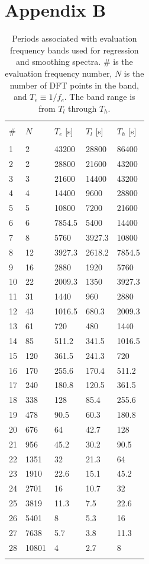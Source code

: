 \documentclass[draft,linenumbers]{agujournal2018}
\begin{document}
\section{Appendix B}

\begin{table}
  \caption{Periods associated with evaluation frequency bands used for regression and smoothing spectra. \# is the evaluation frequency number, $N$ is the number of DFT points in the band, and $T_e\equiv 1/f_e$. The band range is from $T_l$ through $T_h$.}
  \centering
  \begin{tabular}{l l l l l}
    \hline \\
    \# & $N$ & $T_e$ [s] & $T_l$ [s] & $T_h$ [s] \\
    \hline \\
    1 & 2 & 43200 & 28800 & 86400 \\
    2 & 2 & 28800 & 21600 & 43200 \\
    3 & 3 & 21600 & 14400 & 43200 \\
    4 & 4 & 14400 & 9600 & 28800 \\
    5 & 5 & 10800 & 7200 & 21600 \\
    6 & 6 & 7854.5 & 5400 & 14400 \\
    7 & 8 & 5760 & 3927.3 & 10800 \\
    8 & 12 & 3927.3 & 2618.2 & 7854.5 \\
    9 & 16 & 2880 & 1920 & 5760 \\
    10 & 22 & 2009.3 & 1350 & 3927.3 \\
    11 & 31 & 1440 & 960 & 2880 \\
    12 & 43 & 1016.5 & 680.3 & 2009.3 \\
    13 & 61 & 720 & 480 & 1440 \\
    14 & 85 & 511.2 & 341.5 & 1016.5 \\
    15 & 120 & 361.5 & 241.3 & 720 \\
    16 & 170 & 255.6 & 170.4 & 511.2 \\
    17 & 240 & 180.8 & 120.5 & 361.5 \\
    18 & 338 & 128 & 85.4 & 255.6 \\
    19 & 478 & 90.5 & 60.3 & 180.8 \\
    20 & 676 & 64 & 42.7 & 128 \\
    21 & 956 & 45.2 & 30.2 & 90.5 \\
    22 & 1351 & 32 & 21.3 & 64 \\
    23 & 1910 & 22.6 & 15.1 & 45.2 \\
    24 & 2701 & 16 & 10.7 & 32 \\
    25 & 3819 & 11.3 & 7.5 & 22.6 \\
    26 & 5401 & 8 & 5.3 & 16 \\
    27 & 7638 & 5.7 & 3.8 & 11.3 \\
    28 & 10801 & 4 & 2.7 & 8 \\
    \hline \\
  \end{tabular}
  \label{evaluationperiods}
\end{table}

\clearpage


\end{document}
